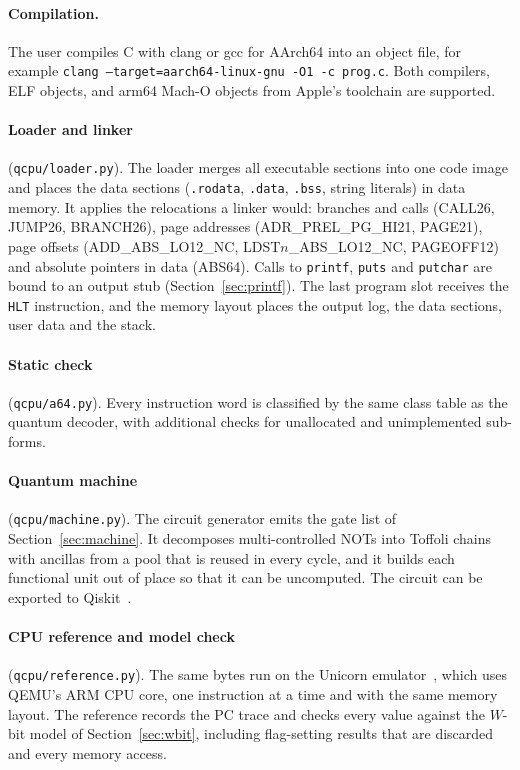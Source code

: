 \documentclass[11pt]{article}
\begin{document}
\paragraph{Compilation.} The user compiles C with clang or gcc for AArch64 into an object
file, for example \texttt{clang --target=aarch64-linux-gnu -O1 -c prog.c}. Both compilers,
ELF objects, and arm64 Mach-O objects from Apple's toolchain are supported.

\paragraph{Loader and linker} (\texttt{qcpu/loader.py}). The loader merges all executable
sections into one code image and places the data sections (\texttt{.rodata}, \texttt{.data},
\texttt{.bss}, string literals) in data memory. It applies the relocations a linker would:
branches and calls (CALL26, JUMP26, BRANCH26), page addresses (ADR\_PREL\_PG\_HI21, PAGE21),
page offsets (ADD\_ABS\_LO12\_NC, LDST$n$\_ABS\_LO12\_NC, PAGEOFF12) and absolute pointers in
data (ABS64). Calls to \texttt{printf}, \texttt{puts} and \texttt{putchar} are bound to an
output stub (Section~\ref{sec:printf}). The last program slot receives the \texttt{HLT}
instruction, and the memory layout places the output log, the data sections, user data and
the stack.

\paragraph{Static check} (\texttt{qcpu/a64.py}). Every instruction word is classified by the
same class table as the quantum decoder, with additional checks for unallocated and
unimplemented sub-forms.

\paragraph{Quantum machine} (\texttt{qcpu/machine.py}). The circuit generator emits the gate
list of Section~\ref{sec:machine}. It decomposes multi-controlled NOTs into Toffoli chains with
ancillas from a pool that is reused in every cycle, and it builds each functional unit out of
place so that it can be uncomputed. The circuit can be exported to Qiskit~\cite{qiskit2024}.

\paragraph{CPU reference and model check} (\texttt{qcpu/reference.py}). The same bytes run on
the Unicorn emulator~\cite{unicorn}, which uses QEMU's ARM CPU core, one instruction at a
time and with the same memory layout. The reference records the PC trace and checks every
value against the $W$-bit model of Section~\ref{sec:wbit}, including flag-setting results
that are discarded and every memory access.
\end{document}
